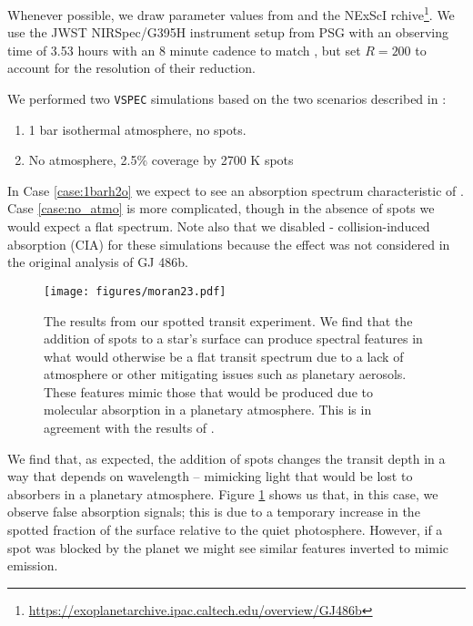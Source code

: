 \documentclass[linenumbers,preprint,authoryear]{elsarticle}
\newcommand{\vspec}[1]{\texttt{VSPEC}#1}
\begin{document}
Whenever possible, we draw parameter values from \citet{moran2023} and the NExScI rchive\footnote{\url{https://exoplanetarchive.ipac.caltech.edu/overview/GJ486b}}. We use the JWST NIRSpec/G395H instrument setup from PSG with an observing time of 3.53 hours with an 8 minute cadence to match \citet{moran2023}, but set $R=200$ to account for the resolution of their reduction.

We performed two \vspec{} simulations based on the two scenarios described in \citet{moran2023}:
\begin{enumerate}
    \item 1 bar  isothermal atmosphere, no spots. \label{case:1barh2o}
    \item No atmosphere, 2.5\% coverage by 2700 K spots \label{case:no_atmo}
\end{enumerate}

In Case \ref{case:1barh2o} we expect to see an absorption spectrum characteristic of . Case \ref{case:no_atmo} is more complicated, though in the absence of spots we would expect a flat spectrum. Note also that we disabled - collision-induced absorption (CIA) for
these simulations because the effect was not considered in the original analysis of GJ 486b.

\begin{figure}
    \centering
    \texttt{[image: figures/moran23.pdf]}
    \caption{
        The results from our spotted transit experiment. We find that the addition of spots to a star's surface can produce spectral features in what would otherwise be a flat transit spectrum due to a lack of atmosphere or other mitigating issues such as planetary aerosols.  These features mimic those that would be produced due to molecular absorption in a planetary atmosphere. This is in agreement with the results of \citet{moran2023}.
        }
    \label{fig:moran_transit}
\end{figure}

We find that, as expected, the addition of spots changes the transit depth in a way that depends on wavelength -- mimicking light that would be lost to absorbers in a planetary atmosphere. Figure \ref{fig:moran_transit} shows us that, in this case, we observe false absorption signals; this is due to a temporary increase in the spotted fraction of the surface relative to the quiet photosphere. However, if a spot was blocked by the planet we might see similar features inverted to mimic emission.
\end{document}
